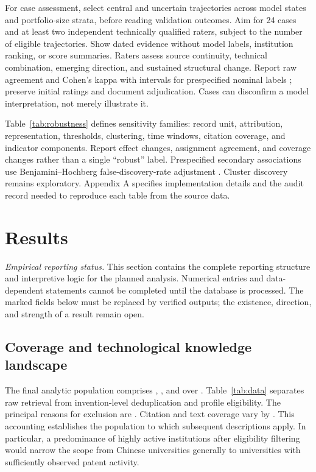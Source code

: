 For case assessment, select central and uncertain trajectories across model
states and portfolio-size strata, before reading validation outcomes. Aim for
24 cases and at least two independent technically qualified raters, subject to
the number of eligible trajectories. Show dated evidence without model labels,
institution ranking, or score summaries. Raters assess source continuity,
technical combination, emerging direction, and sustained structural change.
Report raw agreement and Cohen's kappa with intervals for prespecified nominal
labels \citep{cohen1960}; preserve initial ratings and document adjudication.
Cases can disconfirm a model interpretation, not merely illustrate it.

Table~\ref{tab:robustness} defines sensitivity families: record unit, attribution,
representation, thresholds, clustering, time windows, citation coverage, and
indicator components. Report effect changes, assignment agreement, and coverage
changes rather than a single ``robust'' label. Prespecified secondary
associations use Benjamini--Hochberg false-discovery-rate adjustment
\citep{benjamini1995}. Cluster discovery remains exploratory. Appendix A
specifies implementation details and the audit record needed to reproduce each
table from the source data.

\section{Results}\label{sec:results}
\textit{Empirical reporting status.} This section contains the complete reporting
structure and interpretive logic for the planned analysis. Numerical entries and
data-dependent statements cannot be completed until the database is processed.
The marked fields below must be replaced by verified outputs; the existence,
direction, and strength of a result remain open.

\subsection{Coverage and technological knowledge landscape}
The final analytic population comprises ,
, and 
over . Table~\ref{tab:data} separates
raw retrieval from invention-level deduplication and profile eligibility. The
principal reasons for exclusion are .
Citation and text coverage vary by . This accounting establishes the population to which subsequent
descriptions apply. In particular, a predominance of highly active institutions
after eligibility filtering would narrow the scope from Chinese universities
generally to universities with sufficiently observed patent activity.

